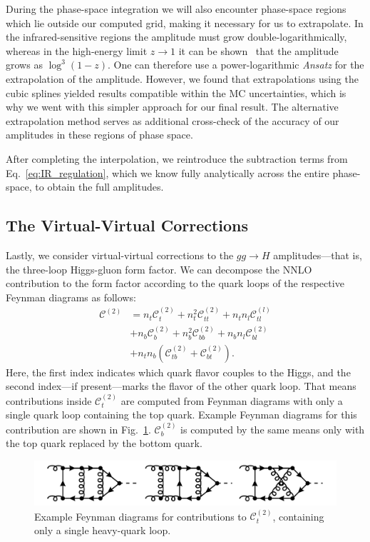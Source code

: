 During the phase-space integration we will also encounter phase-space regions which lie outside our computed grid, making it necessary for us to extrapolate. In the infrared-sensitive regions the amplitude must grow double-logarithmically, whereas in the high-energy limit $z \rightarrow 1$ it can be shown~\cite{Marzani:2008az, Harlander:2009my} that the amplitude grows as $\log^3(1 - z)$. One can therefore use a power-logarithmic \textit{Ansatz} for the extrapolation of the amplitude. However, we found that extrapolations using the cubic splines yielded results compatible within the \acs{MC} uncertainties, which is why we went with this simpler approach for our final result. The alternative extrapolation method serves as additional cross-check of the accuracy of our amplitudes in these regions of phase space.

After completing the interpolation, we reintroduce the subtraction terms from Eq.~\eqref{eq:IR_regulation}, which we know fully analytically across the entire phase-space, to obtain the full amplitudes.

\subsection{The Virtual-Virtual Corrections} \label{subsec:5:virtual_virtual_corrections}
Lastly, we consider virtual-virtual corrections to the $gg \longrightarrow H$ amplitudes---that is, the three-loop Higgs-gluon form factor. We can decompose the \acs{NNLO} contribution to the form factor according to the quark loops of the respective Feynman diagrams as follows:
\begin{equation}
\begin{split}
\mathcal{C}^{(2)} &=  n_t \mathcal{C}_t^{(2)} + n_t^2 \mathcal{C}_{tt}^{(2)} + n_t n_l \mathcal{C}_{tl}^{(l)} \\
& + n_b \mathcal{C}_b^{(2)} + n_b^2 \mathcal{C}_{bb}^{(2)} + n_b n_l \mathcal{C}_{bl}^{(2)} \\
& + n_t n_b \left( \mathcal{C}_{tb}^{(2)} + \mathcal{C}_{bt}^{(2)} \right).
\end{split}
\end{equation}
Here, the first index indicates which quark flavor couples to the Higgs, and the second index---if present---marks the flavor of the other quark loop.
That means contributions inside $\mathcal{C}_t^{(2)}$ are computed from Feynman diagrams with only a single quark loop containing the top quark. Example Feynman diagrams for this contribution are shown in Fig.~\ref{fig:5:C_t}. $\mathcal{C}_{b}^{(2)}$ is computed by the same means only with the top quark replaced by the bottom quark.
\begin{figure}[h]
\centering
\includegraphics[width=\figurewidth]{Images/NNLO_Feynman_diagrams/C_t.pdf}
\caption{Example Feynman diagrams for contributions to $\mathcal{C}^{(2)}_{t}$, containing only a single heavy-quark loop.}
\label{fig:5:C_t}
\end{figure}

